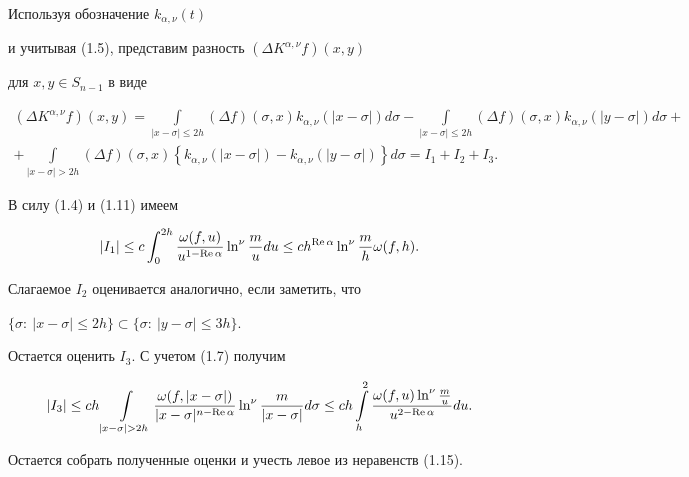 \begin{pf}


Используя обозначение ${k}_{\alpha,\nu} (t)$


и учитывая (1.5), представим разность $(\Delta K^{\alpha,\nu} f)(x,y)$


для $x,y \in S_{n-1}$ в виде


\begin{multline*}


(\Delta K^{\alpha,\nu} f)(x,y) = 


\int \limits_{|x-\sigma|\le 2h} 


(\Delta f)(\sigma,x){k}_{\alpha,\nu} (|x-\sigma|)d\sigma-


\int \limits_{|x-\sigma| \le 2h} (\Delta f)(\sigma, x){k}_{\alpha,\nu}


(|y-\sigma|) d\sigma + \\


+ \int \limits_{|x-\sigma|>2h} (\Delta f)(\sigma, x)\left\{{


k}_{\alpha,\nu} (|x-\sigma|) -{k}_{\alpha,\nu} (|y-\sigma|) \right\}


d\sigma =I_1 + I_2 + I_3.


\end{multline*}





В силу (1.4) и (1.11) имеем


$$


|I_1|\le c\int_0^{2h} \frac{\omega(f,u)}{u^{1-\re \alpha}}


\ln^\nu \frac{m}{u}du


\le c h^{\re \alpha} \ln^\nu \frac{m}{h} \omega(f,h).


$$


Слагаемое $I_2$ оценивается аналогично, если заметить, что


$\{ \sigma: \ |x-\sigma| \leq 2h \} \subset \{ \sigma:\ |y-\sigma| \le3h\}.$


Остается оценить $I_3$. С учетом (1.7) получим


$$


|I_3| \le ch \int \limits_{|x-\sigma|>2h} \frac{\omega(f,|x-\sigma|)}


{|x-\sigma|^{n-\re \alpha}} \ln^\nu \frac{m}{|x-\sigma|} d\sigma \le ch


\int \limits_h^2 \frac{\omega(f,u)\ln^\nu \frac{m}{u}}{u^{2-\re


\alpha}}du.


$$


Остается собрать полученные оценки и учесть левое из неравенств (1.15).


\end{pf}





